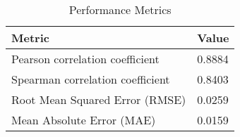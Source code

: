 \documentclass{article}
\begin{document}
\begin{table}[h!]
\centering
\begin{tabular}{ll}
\toprule
Metric & Value \\
\midrule
Pearson correlation coefficient & 0.8884 \\
Spearman correlation coefficient & 0.8403 \\
Root Mean Squared Error (RMSE) & 0.0259 \\
Mean Absolute Error (MAE) & 0.0159 \\
\bottomrule
\end{tabular}
\caption{Performance Metrics}
\label{tab:metrics}
\end{table}
\end{document}
